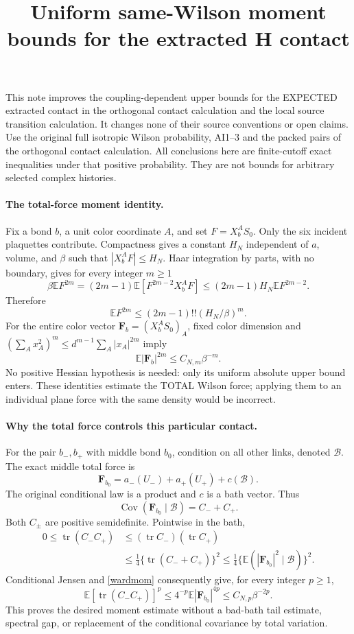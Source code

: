 \documentclass[11pt]{article}
\title{Uniform same-Wilson moment bounds for the extracted H contact}\author{}\date{}
\newcommand{\E}{\mathbb E}
\newcommand{\Cov}{\operatorname{Cov}}
\begin{document}
\maketitle
This note improves the coupling-dependent upper bounds for the EXPECTED extracted
contact in the orthogonal contact calculation and the local source transition calculation. It changes none of their source conventions or open claims.
Use the original full isotropic Wilson probability, AI1--3 and the packed pairs of the orthogonal contact calculation.
All conclusions here are finite-cutoff exact inequalities under that positive probability.
They are not bounds for arbitrary selected complex histories.

\paragraph{The total-force moment identity.}
Fix a bond $b$, a unit color coordinate $A$, and set $F=X_b^AS_0$.
Only the six incident plaquettes contribute. Compactness gives a constant $H_N$ independent
of $a$, volume, and $\beta$ such that $|X_b^AF|\le H_N$.
Haar integration by parts, with no boundary, gives for every integer $m\ge1$
\[
 \beta\E F^{2m}=(2m-1)\E[F^{2m-2}X_b^AF]
 \le(2m-1)H_N\E F^{2m-2}.
\]
Therefore
\begin{equation}\label{wardmom}
 \E F^{2m}\le(2m-1)!!(H_N/\beta)^m.
\end{equation}
For the entire color vector $\mathbf F_b=(X_b^AS_0)_A$, fixed color dimension and
$(\sum_A x_A^2)^m\le d^{m-1}\sum_A|x_A|^{2m}$ imply
\[
 \E|\mathbf F_b|^{2m}\le C_{N,m}\beta^{-m}.
\]
No positive Hessian hypothesis is needed: only its uniform absolute upper bound enters.
These identities estimate the TOTAL Wilson force; applying them to an individual plane
force with the same density would be incorrect.

\paragraph{Why the total force controls this particular contact.}
For the pair $b_-,b_+$ with middle bond $b_0$, condition on all other links, denoted $\mathcal B$.
The exact middle total force is
\[
 \mathbf F_{b_0}=a_-(U_-)+a_+(U_+)+c(\mathcal B).
\]
The original conditional law is a product and $c$ is a bath vector. Thus
\[
 \Cov(\mathbf F_{b_0}\mid\mathcal B)=C_-+C_+.
\]
Both $C_\pm$ are positive semidefinite. Pointwise in the bath,
\begin{align}
 0\le\operatorname{tr}(C_-C_+)
 &\le (\operatorname{tr}C_-)(\operatorname{tr}C_+)\\
 &\le\tfrac14\{\operatorname{tr}(C_-+C_+)\}^2
 \le\tfrac14\{\E(|\mathbf F_{b_0}|^2\mid\mathcal B)\}^2.
\end{align}
Conditional Jensen and \eqref{wardmom} consequently give, for every integer $p\ge1$,
\begin{equation}\label{covmom}
 \E[\operatorname{tr}(C_-C_+)]^p
 \le4^{-p}\E|\mathbf F_{b_0}|^{4p}
 \le C_{N,p}\beta^{-2p}.
\end{equation}
This proves the desired moment estimate without a bad-bath tail estimate, spectral gap,
or replacement of the conditional covariance by total variation.
\end{document}
